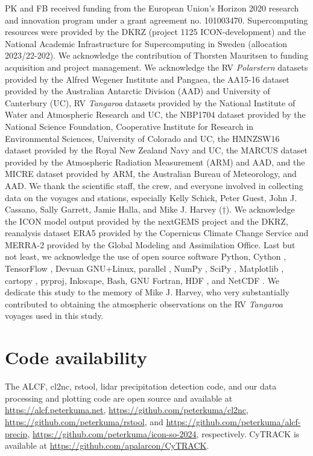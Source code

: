 \documentclass[12pt,a4paper]{article}
\begin{document}
PK and FB received funding from the European Union’s Horizon 2020 research and
innovation program under a grant agreement no. 101003470. Supercomputing
resources were provided by the DKRZ (project 1125 ICON-development) and the
National Academic Infrastructure for Supercomputing in Sweden (allocation
2023/22-202). We acknowledge the contribution of Thorsten Mauritsen to funding
acquisition and project management.  We acknowledge the RV \emph{Polarstern}
datasets provided by the Alfred Wegener Institute and Pangaea, the AA15-16
dataset provided by the Australian Antarctic Division (AAD) and University of
Canterbury (UC), RV \emph{Tangaroa} datasets provided by the National Institute
of Water and Atmospheric Research and UC, the NBP1704 dataset provided by the
National Science Foundation, Cooperative Institute for Research in
Environmental Sciences, University of Colorado and UC, the HMNZSW16 dataset
provided by the Royal New Zealand Navy and UC, the MARCUS dataset provided by
the Atmospheric Radiation Measurement (ARM) and AAD, and the MICRE dataset
provided by ARM, the Australian Bureau of Meteorology, and AAD. We thank the
scientific staff, the crew, and everyone involved in collecting data on the
voyages and stations, especially Kelly Schick, Peter Guest, John J.  Cassano,
Sally Garrett, Jamie Halla, and Mike J.  Harvey (†). We acknowledge the ICON
model output provided by the nextGEMS project and the DKRZ, reanalysis dataset
ERA5 provided by the Copernicus Climate Change Service and MERRA-2 provided by
the Global Modeling and Assimilation Office.  Last but not least, we
acknowledge the use of open source software Python, Cython \citep{behnel2011},
TensorFlow \citep{abadi2016}, Devuan GNU+Linux, parallel \citep{tange2011},
NumPy \citep{harris2020}, SciPy \citep{virtanen2020}, Matplotlib
\citep{hunter2007}, cartopy \citep{cartopy}, pyproj, Inkscape, Bash, GNU
Fortran, HDF \citep{folk1999}, and NetCDF \citep{rew1990}.  We dedicate this
study to the memory of Mike J.  Harvey, who very substantially contributed to
obtaining the atmospheric observations on the RV \emph{Tangaroa} voyages used
in this study.

\section*{Code availability}

The ALCF, cl2nc, rstool, lidar precipitation detection code, and our data
processing and plotting code are open source and available at
\url{https://alcf.peterkuma.net}, \url{https://github.com/peterkuma/cl2nc},
\url{https://github.com/peterkuma/rstool}, and
\url{https://github.com/peterkuma/alcf-precip},
\url{https://github.com/peterkuma/icon-so-2024}, respectively. CyTRACK is
available at \url{https://github.com/apalarcon/CyTRACK}.
\end{document}
